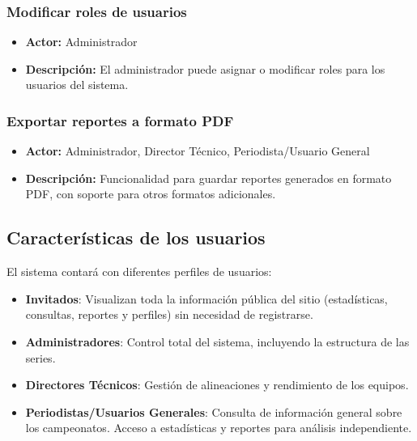 \documentclass{report}
\begin{document}
\begin{enumerate}
            \subsubsection{Modificar roles de usuarios}
            \begin{itemize}
                \item \textbf{Actor:} Administrador
                \item \textbf{Descripción:} El administrador puede asignar o modificar roles para los usuarios del 
                sistema.
            \end{itemize}

            \subsubsection{Exportar reportes a formato PDF}
            \begin{itemize}
                \item \textbf{Actor:} Administrador, Director Técnico, Periodista/Usuario General
                \item \textbf{Descripción:} Funcionalidad para guardar reportes generados en formato PDF, con 
                soporte para otros formatos adicionales.
            \end{itemize}

        \end{enumerate}


        \subsection*{Características de los usuarios}
        El sistema contará con diferentes perfiles de usuarios:
        \begin{itemize}
            \item \textbf{Invitados}: Visualizan toda la información pública del sitio (estadísticas,
            consultas, reportes y perfiles) sin necesidad de registrarse.
            \item \textbf{Administradores}: Control total del sistema, incluyendo la estructura de las series.
            \item \textbf{Directores Técnicos}: Gestión de alineaciones y rendimiento de los equipos.
            \item \textbf{Periodistas/Usuarios Generales}: Consulta de información general sobre los campeonatos. 
            Acceso a estadísticas y reportes para análisis independiente.
        \end{itemize}
\end{document}
